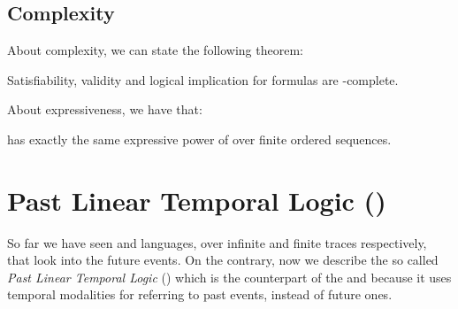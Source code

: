 \subsection{Complexity}
About \LTLf complexity, we can state the following theorem:
\begin{theorem}\citep{de2013linear}
Satisfiability, validity and logical implication for \LTLf formulas are \PSPACE-complete.
\end{theorem}
\noindent About \LTLf expressiveness, we have that:
\begin{theorem}\citep{de2013linear,Gabbay:1997:TAF:903586}
\LTLf has exactly the same expressive power of \FOL over finite ordered sequences.
\end{theorem}
\section{Past Linear Temporal Logic (\PLTL)}
So far we have seen \LTL and \LTLf languages, over infinite and finite traces respectively, that look into the future events. On the contrary, now we describe the so called \textit{Past Linear Temporal Logic} (\PLTL) which is the counterpart of the \LTL and \LTLf because it uses temporal modalities for referring to past events, instead of future ones.
